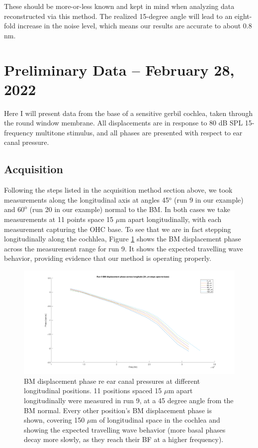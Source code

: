 \documentclass{article}
\begin{document}
\par{These should be more-or-less known and kept in mind when analyzing data reconstructed via this method. The realized 15-degree angle will lead to an eight-fold increase in the noise level, which means our results are accurate to about 0.8 nm.}
\section{Preliminary Data -- February 28, 2022}
\par{Here I will present data from the base of a sensitive gerbil cochlea, taken through the round window membrane. All displacements are in response to 80 dB SPL 15-frequency multitone stimulus, and all phases are presented with respect to ear canal pressure.}
\subsection{Acquisition}
\par{Following the steps listed in the acquisition method section above, we took measurements along the longitudinal axis at angles 45$^\text{o}$ (run 9 in our example) and $60^\text{o}$ (run 20 in our example) normal to the BM. In both cases we take measurements at 11 points space 15 $\mu$m apart longitudinally, with each measurement capturing the OHC base. To see that we are in fact stepping longitudinally along the cochhlea, Figure \ref{BMtravel} shows the BM displacement phase across the measurement range for run 9. It shows the expected travelling wave behavior, providing evidence that our method is operating properly.}

\begin{figure}
	\centering
	\includegraphics[width=\textwidth]{"Figures/Run 9 BM displacement across l.png"}
	\caption{BM displacement phase re ear canal pressures at different longitudinal positions. 11 positions spaced 15 $\mu$m apart longitudinally were measured in run 9, at a 45 degree angle from the BM normal. Every other position's BM displacement phase is shown, covering 150 $\mu$m of longitudinal space in the cochlea and showing the expected travelling wave behavior (more basal phases decay more slowly, as they reach their BF at a higher frequency).}
	\label{BMtravel}
\end{figure}
\end{document}
